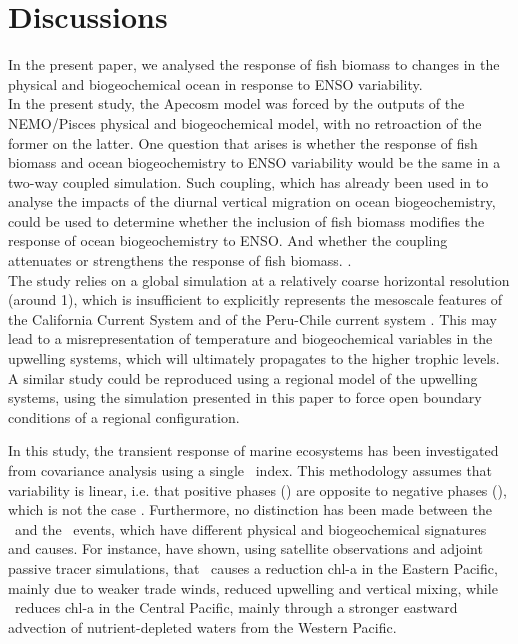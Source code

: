 \section{Discussions}

In the present paper, we analysed the response of fish biomass to changes in the physical and biogeochemical ocean in response to ENSO variability. \\

In the present study, the Apecosm model was forced by the outputs of the NEMO/Pisces physical and biogeochemical model, with no retroaction of the former on the latter. One question that arises is whether the response of fish biomass and ocean biogeochemistry to ENSO variability would be the same in a two-way coupled simulation. 	Such coupling, which has already been used in \cite{aumontEvaluatingPotentialImpacts2018} to analyse the impacts of the diurnal vertical migration on ocean biogeochemistry, could be used to determine whether the inclusion of fish biomass modifies the response of ocean biogeochemistry to ENSO. And whether the coupling attenuates or strengthens the response of fish biomass. . \\

The study relies on a global simulation at a relatively coarse horizontal resolution (around 1\degree), which is insufficient to 
explicitly represents the mesoscale features of the California Current System \citep{capetMesoscaleSubmesoscaleTransition2008} and
of the Peru-Chile current system \citep{colasHeatBalanceEddies2012}. This may lead to a misrepresentation of temperature and biogeochemical variables in the upwelling systems, which will ultimately propagates to the higher trophic levels. A similar study
could be reproduced using a regional model of the upwelling systems, using the simulation presented in this paper to force open boundary conditions of a regional configuration. 

In this study, the transient response of marine ecosystems has been investigated from covariance analysis using a single \nino\ index. This methodology assumes that \enso variability is linear, i.e. that positive \enso phases (\nino) are opposite to negative \enso phases (\nina), which is not the case \citep{okumuraAsymmetryDurationNino2010}. Furthermore, no distinction has been made between the \epn\ and the \cpn\ events, which have different physical and biogeochemical signatures and causes. For instance, \cite{gierachBiologicalResponse19972012} have shown, using satellite observations and adjoint passive tracer simulations, 
that \epn\ causes a reduction chl-a in the Eastern Pacific, mainly due to weaker trade winds, reduced upwelling and vertical mixing, while \cpn\ reduces chl-a in the Central Pacific, mainly through a stronger
eastward advection of nutrient-depleted waters from the Western Pacific. 

